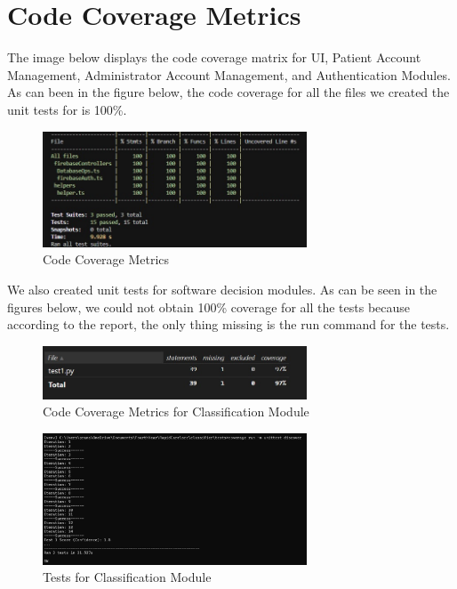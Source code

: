 \documentclass[12pt, titlepage]{article}
\begin{document}
\newpage

\section{Code Coverage Metrics}

The image below displays the code coverage matrix for UI, Patient Account Management, Administrator Account Management, and Authentication Modules. As can been in the figure below, the code coverage for all the files we created the unit tests for is 100\%. 

\begin{figure}[h]
  \centering
  \includegraphics[width=0.7\textwidth]{CodeCoverageMetrics.jpg}
  \caption{Code Coverage Metrics}
  \label{FigUH}
\end{figure}

\clearpage

We also created unit tests for software decision modules. As can be seen in the figures below, we could not obtain 100\% coverage for all the tests because according to the report, the only thing missing is the run command for the tests.

\begin{figure}[h]
  \centering
  \includegraphics[width=0.7\textwidth]{CCMforClassify.jpg}
  \caption{Code Coverage Metrics for Classification Module}
  \label{FigUH}
\end{figure}

\begin{figure}[h]
  \centering
  \includegraphics[width=0.7\textwidth]{Classifytests.jpg}
  \caption{Tests for Classification Module}
  \label{FigUH}
\end{figure}
\end{document}
